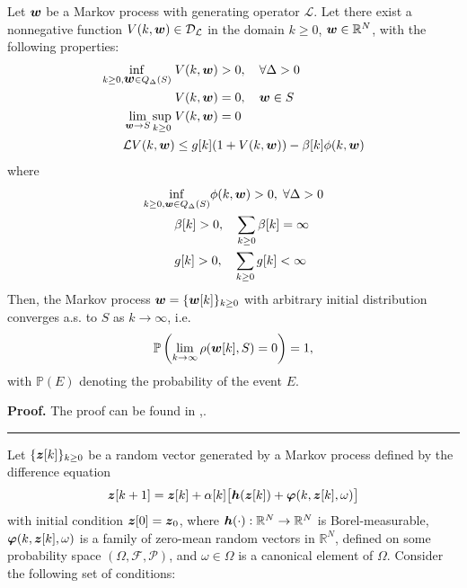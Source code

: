 \documentclass[10pt,twocolumn]{IEEEtran}
\def\bh{\mbox{\boldmath $h$}}
\def\bh{\mbox{\boldmath $h$}}
\def\bw{\mbox{\boldmath $w$}}
\def\bz{\mbox{\boldmath $z$}}
\newenvironment{proof}[1][Proof]{\noindent \textbf{#1.} }{\qedsymbol}
\newcommand{\qedsymbol}{\hspace{\fill}\rule{1.5ex}{1.5ex}}
\begin{document}
 Let $\bw$ be a Markov process with generating operator $\mathcal{L}$. Let there exist a nonnegative function $V(k,\bw)\in\mathcal{D}_\mathcal{L}$ in the domain $k\geq 0$, $\bw\in \mathbb{R}^{N}$, with the following properties:
\begin{align}
\inf_{k\geq0, \bw\in Q_\Delta(S)} \;&V(k,\bw)>0, \quad \forall \Delta>0 \\
&V(k,\boldsymbol{w})=0, \quad \bw\in S \\
\lim_{\boldsymbol{w}\rightarrow S} \sup_{k\geq 0}\; &V(k,\bw)=0  \\
\mathcal{L}V(k,\bw)&\leq g[k](1+V(k,\bw))-\beta[k]\phi(k,\bw) \label{LV}
\end{align}
where
\begin{align}
\inf_{k\geq0, \boldsymbol{w}\in Q_\Delta(S)}& \phi(k,\bw) >0, \;\forall \Delta>0 \\
&\hspace{-1cm}\beta[k]>0, \quad \sum_{k\geq 0} \beta[k]=\infty \\
&\hspace{-1cm} g[k]>0, \quad \sum_{k\geq 0} g[k]<\infty
\end{align}
Then, the Markov process $\bw=\{\bw[k]\}_{k\geq 0}$ with arbitrary initial distribution converges a.s. to $S$ as $k\rightarrow\infty$, i.e.
\begin{align}
\mathbb{P}\left(\lim_{k \rightarrow \infty} \rho(\bw[k],S)=0\right)=1,
\end{align}
with $\mathbb{P}(E)$ denoting the probability of the event $E$.

\begin{proof}
The proof can be found in \cite{Nevel},\cite{Kar-Moura}.
\end{proof}


Let $\{\bz[k]\}_{k\geq0}$ be a random vector generated by a Markov process defined by the difference equation
\begin{eqnarray}\label{Stoch_Recursion}
\bz[k+1]=\bz[k]+\alpha[k]\big[\bh(\bz[k])+\boldsymbol{\varphi}(k,\bz[k],\omega)\big]
\end{eqnarray}
with initial condition $\bz[0]=\bz_0$, where $\bh(\cdot):\mathbb{R}^{N}\rightarrow \mathbb{R}^{N}$ is Borel-measurable,
$\boldsymbol{\varphi}(k,\bz[k],\omega)$ is a family of zero-mean random vectors in $\mathbb{R}^{N}$, defined on some probability space $(\Omega,\mathcal{F},\mathcal{P})$, and $\omega\in\Omega$ is a canonical element of $\Omega$.
Consider the following set of conditions:
\end{document}
